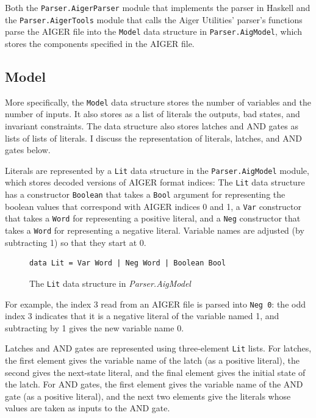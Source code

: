 \documentclass[12pt,a4paper,twoside,openright]{report}
\begin{document}
{Both the \verb,Parser.AigerParser, module that implements the parser in Haskell and
the \verb,Parser.AigerTools, module that calls the Aiger Utilities' parser's functions
parse the AIGER file into the \verb,Model, data structure in \verb,Parser.AigModel,,
which stores the components specified in the AIGER file.

\subsection{Model}

More specifically, the \verb,Model, data structure stores the number of variables and
the number of inputs. It also stores as a list of literals the outputs, bad states,
and invariant constraints. The data structure also stores latches and AND gates as
lists of lists of literals. I discuss the representation of literals, latches, and
AND gates below.

Literals are represented by a \verb,Lit, data structure in the \verb,Parser.AigModel,
module, which stores decoded versions of AIGER format indices:
The \verb,Lit, data structure has a constructor \verb,Boolean, that takes a \verb,Bool,
argument for representing the boolean values that correspond with AIGER indices
0 and 1, a \verb,Var, constructor that takes a \verb,Word, for representing a positive literal,
and a \verb,Neg, constructor that takes a \verb,Word, for representing a negative literal.
Variable names are adjusted (by subtracting 1) so that they start at 0.

\begin{figure}[H]
\centering
\begin{verbatim}
data Lit = Var Word | Neg Word | Boolean Bool
\end{verbatim}
\caption{The {\tt Lit} data structure in {\it Parser.AigModel}}
\end{figure}

For example, the index 3 read from an AIGER file is parsed into \verb,Neg 0,:
the odd index 3 indicates that it is a negative literal of the variable named 1, and
subtracting by 1 gives the new variable name 0.

Latches and AND gates are represented using three-element \verb,Lit, lists.
For latches, the first element gives the variable name of the latch (as a positive literal),
the second gives the next-state literal, and the final element gives the initial state
of the latch. For AND gates, the first element gives the variable name of the AND gate
(as a positive literal), and the next two elements give the literals whose values are taken
as inputs to the AND gate.

}
\end{document}
